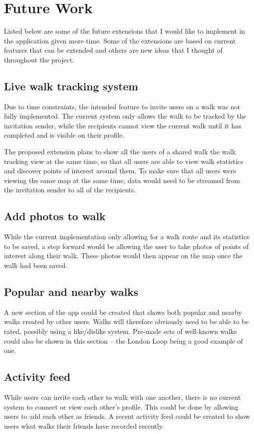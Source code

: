 \section{Future Work} \label{section:future-work}

Listed below are some of the future extensions that I would like to implement in the application given more time. Some of the extensions are based on current features that can be extended and others are new ideas that I thought of throughout the project.

\subsection{Live walk tracking system}

Due to time constraints, the intended feature to invite users on a walk was not fully implemented. The current system only allows the walk to be tracked by the invitation sender, while the recipients cannot view the current walk until it has completed and is visible on their profile.

The proposed extension plans to show all the users of a shared walk the walk tracking view at the same time, so that all users are able to view walk statistics and discover points of interest around them. To make sure that all users were viewing the same map at the same time, data would need to be streamed from the invitation sender to all of the recipients.

\subsection{Add photos to walk}

While the current implementation only allowing for a walk route and its statistics to be saved, a step forward would be allowing the user to take photos of points of interest along their walk. These photos would then appear on the map once the walk had been saved.

\subsection{Popular and nearby walks}

A new section of the app could be created that shows both popular and nearby walks created by other users. Walks will therefore obviously need to be able to be rated, possibly using a like/dislike system. Pre-made sets of well-known walks could also be shown in this section -- the London Loop being a good example of one.

\subsection{Activity feed}

While users can invite each other to walk with one another, there is no current system to connect or view each other's profile. This could be done by allowing users to add each other as friends. A recent activity feed could be created to show users what walks their friends have recorded recently.


